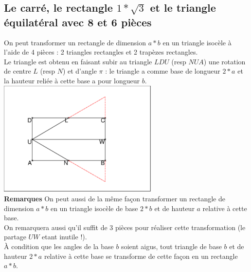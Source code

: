 \documentclass[a4paper,11pt]{book}
\begin{document}
\subsection{Le carr\'e, le rectangle $1*\sqrt3$ et le triangle \'equilat\'eral avec 8 et 6 pi\`eces}
On peut transformer un rectangle de dimension $a*b$ en un triangle isoc\`ele 
\`a l'aide de 4 pi\`eces : 2 triangles rectangles et 2 trap\`ezes rectangles.\\
Le triangle est obtenu en faisant subir au triangle $LDU$ (resp $NUA$) une 
rotation de centre $L$ (resp $N$) et d'angle $\pi$ : le triangle a comme base 
de longueur $2*a$ et la hauteur reli\'ee \`a cette base a pour longueur $b$.\\
\includegraphics[width=8cm]{puzzleca0}\\
{\bf Remarques}
On peut aussi de la m\^eme fa\c{c}on transformer un rectangle de dimension 
$a*b$ en un triangle isoc\`ele de base $2*b$ et de hauteur $a$ relative \`a 
cette base.\\
On remarquera aussi qu'il suffit de 3 pi\`eces pour r\'ealiser cette 
transformation (le partage $UW$ etant inutile !).\\
\`A condition que les angles de la base $b$ soient aigus, tout triangle de base
$b$ et de hauteur $2*a$ relative \`a cette base se transforme de cette fa\c{c}on
en un rectangle $a*b$.
\end{document}
